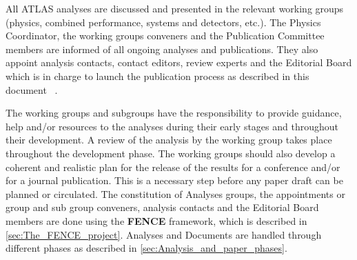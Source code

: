 All ATLAS analyses are discussed and presented in the relevant working groups  (physics, combined performance, systems and detectors, etc.). The Physics Coordinator, the working groups conveners and the Publication Committee members are informed of all ongoing analyses and publications. They also appoint analysis contacts, contact editors, review experts and the Editorial Board which is in charge to launch the publication process as described in this  document~\cite{Pub-policy} .

The working groups and subgroups have the responsibility to provide guidance, help and/or resources to the analyses during their early stages and throughout their development. A review of the analysis by the working group takes place throughout the development phase. The working groups should also develop a coherent and realistic plan for the release  of the results for a conference and/or for a journal publication. This is a necessary step before any paper draft can be planned or circulated. The constitution of Analyses groups, the appointments or group and sub group conveners, analysis contacts and the Editorial Board members are done using the\textbf{ FENCE} framework, which is described in \cref{sec:The_FENCE_project}. Analyses and Documents are handled through different phases as described in \cref{sec:Analysis_and_paper_phases}.

